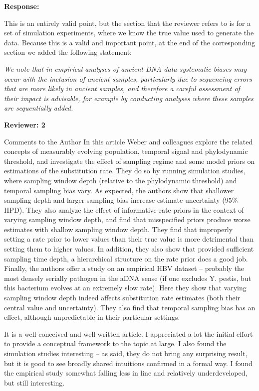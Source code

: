 \documentclass[11pt]{article}
\begin{document}
{\color{blue}
	\textbf{Response:}
	
	This is an entirely valid point, but the section that the reviewer refers to is for a set of simulation experiments, where we know the true value used to generate the data. Because this is a valid and important point, at the end of the corresponding section we added the following statement:

	\textit{We note that in empirical analyses of ancient DNA data systematic biases may occur with the inclusion of ancient samples, particularly due to sequencing errors that are more likely in ancient samples, and therefore a careful assessment of their impact is advisable, for example by conducting analyses where these samples are sequentially added.}
}



\textbf{Reviewer: 2}

Comments to the Author
In this article Weber and colleagues explore the related concepts of measurably evolving population, temporal signal and phylodynamic threshold, and investigate the effect of sampling regime and some model priors on estimations of the substitution rate. They do so by running simulation studies, where sampling window depth (relative to the phylodynamic threshold) and temporal sampling bias vary. As expected, the authors show that shallower sampling depth and larger sampling bias increase estimate uncertainty (95\% HPD). They also analyze the effect of informative rate priors in the context of varying sampling window depth, and find that misspecified priors produce worse estimates with shallow sampling window depth. They find that improperly setting a rate prior to lower values than their true value is more detrimental than setting them to higher values. In addition, they also show that provided sufficient sampling time depth, a hierarchical structure on the rate prior does a good job. Finally, the authors offer a study on an empirical HBV dataset – probably the most densely serially pathogen in the aDNA sense (if one excludes Y. pestis, but this bacterium evolves at an extremely slow rate). Here they show that varying sampling window depth indeed affects substitution rate estimates (both their central value and uncertainty). They also find that temporal sampling bias has an effect, although unpredictable in their particular settings.

It is a well-conceived and well-written article. I appreciated a lot the initial effort to provide a conceptual framework to the topic at large. I also found the simulation studies interesting – as said, they do not bring any surprising result, but it is good to see broadly shared intuitions confirmed in a formal way. I found the empirical study somewhat falling less in line and relatively underdeveloped, but still interesting.
\end{document}
